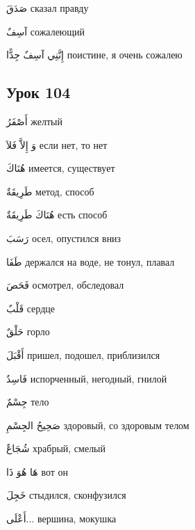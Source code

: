 \documentclass[a5paper]{article}
\newcommand\textstyleDropCaps[1]{#1}
\newcommand\textstyleCaptioncharacters[1]{#1}
\begin{document}
\textstyleCaptioncharacters{صَدَقَ }\textstyleDropCaps{сказал правду‎}

\textstyleCaptioncharacters{آسِفٌ }\textstyleDropCaps{сожалеющий‎}

\textstyleCaptioncharacters{إِنَّنِي آسِفٌ جِدًّا }\textstyleDropCaps{поис­тине, я очень сожалею‎}

\subsection[Урок 104‎]{\textstyleDropCaps{Урок 104‎}}
\textstyleCaptioncharacters{أَصْفَرُ }\textstyleDropCaps{желтый‎}

\textstyleCaptioncharacters{وَ إِلاَّ فَلاَ }\textstyleDropCaps{если нет, то нет‎}

\textstyleCaptioncharacters{هُنَاكَ }\textstyleDropCaps{имеется, существу­ет‎}

\textstyleCaptioncharacters{طَرِيقَةٌ }\textstyleDropCaps{метод, способ‎}

\textstyleCaptioncharacters{هُنَاكَ طَرِيقَةٌ }\textstyleDropCaps{есть способ‎}

\textstyleCaptioncharacters{رَسَبَ }\textstyleDropCaps{осел, опустился вниз‎}

\textstyleCaptioncharacters{طَفَا }\textstyleDropCaps{держался на воде, не тонул, плавал‎}

\textstyleCaptioncharacters{فَحَصَ }\textstyleDropCaps{осмотрел, обсле­довал‎}

\textstyleCaptioncharacters{قَلْبٌ }\textstyleDropCaps{сердце‎}

\textstyleCaptioncharacters{حَلْقٌ }\textstyleDropCaps{горло‎}

\textstyleCaptioncharacters{أَقْبَلَ }\textstyleDropCaps{пришел, подошел, приблизился‎}

\textstyleCaptioncharacters{فَاسِدٌ }\textstyleDropCaps{испорченный, не­годный, гнилой‎}

\textstyleCaptioncharacters{جِسْمٌ }\textstyleDropCaps{тело‎}

\textstyleCaptioncharacters{صَحِيحُ الجِسْمِ }\textstyleDropCaps{здоро­вый, со здоровым телом‎}

\textstyleCaptioncharacters{شُجَاعٌ }\textstyleDropCaps{храбрый, смелый‎}

\textstyleCaptioncharacters{هَا هُوَ ذَا }\textstyleDropCaps{вот он‎}

\textstyleCaptioncharacters{خَجِلَ }\textstyleDropCaps{стыдился, сконфу­зился‎}

\textstyleCaptioncharacters{أَعْلَى... }\textstyleDropCaps{вершина, мокуш­ка‎}
\end{document}
